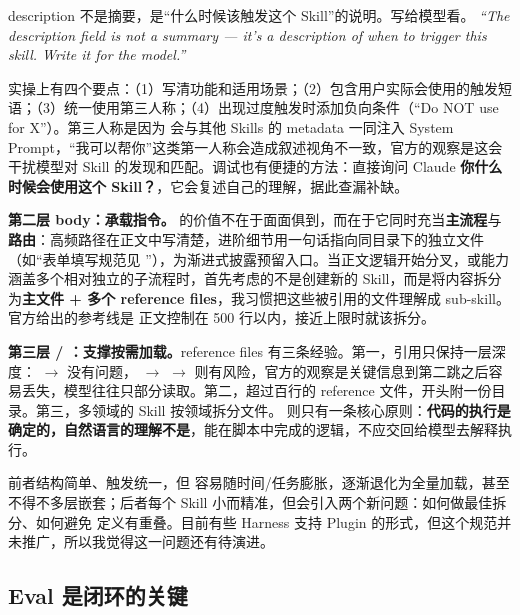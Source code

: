 \begin{blockquote}
description 不是摘要，是“什么时候该触发这个 Skill”的说明。写给模型看。
\textit{“The description field is not a summary --- it's a description of when to trigger this skill. Write it for the model.”}
\end{blockquote}

实操上有四个要点：（1）写清功能和适用场景；（2）包含用户实际会使用的触发短语；（3）统一使用第三人称；（4）出现过度触发时添加负向条件（“Do NOT use for X”）。第三人称是因为  会与其他 Skills 的 metadata 一同注入 System Prompt，“我可以帮你”这类第一人称会造成叙述视角不一致，官方的观察是这会干扰模型对 Skill 的发现和匹配。调试也有便捷的方法：直接询问 Claude \textbf{你什么时候会使用这个 Skill？}，它会复述自己的理解，据此查漏补缺。

\textbf{第二层 body：承载指令。} 的价值不在于面面俱到，而在于它同时充当\textbf{主流程}与\textbf{路由}：高频路径在正文中写清楚，进阶细节用一句话指向同目录下的独立文件（如“表单填写规范见 ”），为渐进式披露预留入口。当正文逻辑开始分叉，或能力涵盖多个相对独立的子流程时，首先考虑的不是创建新的 Skill，而是将内容拆分为\textbf{主文件 + 多个 reference files}，我习惯把这些被引用的文件理解成 sub-skill。官方给出的参考线是  正文控制在 500 行以内，接近上限时就该拆分。

\textbf{第三层  / ：支撑按需加载。}reference files 有三条经验。第一，引用只保持一层深度： $\to$  没有问题， $\to$  $\to$  则有风险，官方的观察是关键信息到第二跳之后容易丢失，模型往往只部分读取。第二，超过百行的 reference 文件，开头附一份目录。第三，多领域的 Skill 按领域拆分文件。 则只有一条核心原则：\textbf{代码的执行是确定的，自然语言的理解不是}，能在脚本中完成的逻辑，不应交回给模型去解释执行。

\begin{notebox}
前者结构简单、触发统一，但  容易随时间/任务膨胀，逐渐退化为全量加载，甚至不得不多层嵌套；后者每个 Skill 小而精准，但会引入两个新问题：如何做最佳拆分、如何避免  定义有重叠。目前有些 Harness 支持 Plugin 的形式，但这个规范并未推广，所以我觉得这一问题还有待演进。
\end{notebox}

\subsection{Eval 是闭环的关键}

